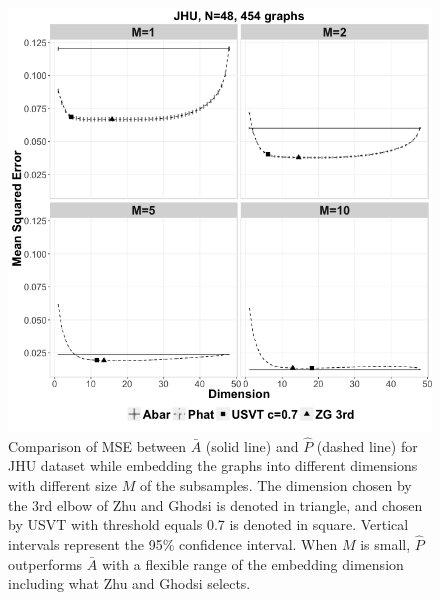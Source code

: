 \documentclass[a4paper]{article}
\begin{document}
\begin{figure}[!htb]
\centering
\includegraphics[width=1\textwidth]{JHU.png}
\caption{Comparison of MSE between $\bar{A}$ (solid line) and $\hat{P}$ (dashed line) for JHU dataset while embedding the graphs into different dimensions with different size $M$ of the subsamples. The dimension chosen by the 3rd elbow of Zhu and Ghodsi is denoted in triangle, and chosen by USVT with threshold equals 0.7 is denoted in square. Vertical intervals represent the 95\% confidence interval. When $M$ is small, $\hat{P}$ outperforms $\bar{A}$ with a flexible range of the embedding dimension including what Zhu and Ghodsi selects.}
\label{fig:JHU}
\end{figure}
\end{document}
